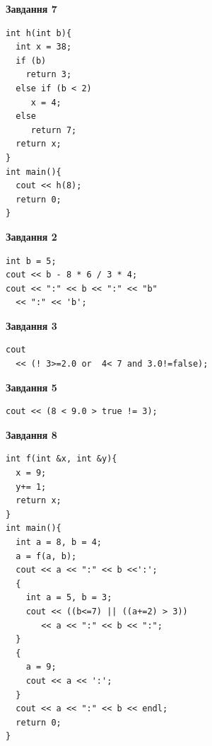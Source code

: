 \documentclass[12pt, ukrainian]{article}
\begin{document}
{\begin {large}
\begin{minipage}[t]{7.0cm}
\begin{center}
\textbf{Завдання 7}
\end{center}
\vspace{-8mm}

\begin{verbatim}
int h(int b){
  int x = 38;
  if (b)
    return 3;
  else if (b < 2)
     x = 4;
  else
     return 7;
  return x;
}
int main(){
  cout << h(8);
  return 0;
}
\end{verbatim}

\end{minipage}
\vline \hspace{1mm}
\begin{minipage}[t]{11.0cm}

\begin{center}
\textbf{Завдання 2}
\end{center}
\vspace{-8mm}

\begin{verbatim}
int b = 5;
cout << b - 8 * 6 / 3 * 4;
cout << ":" << b << ":" << "b" 
  << ":" << 'b';
\end{verbatim}



\begin{center}
\textbf{Завдання 3}
\end{center}
\vspace{-8mm}

\begin{verbatim}
cout 
  << (! 3>=2.0 or  4< 7 and 3.0!=false);
\end{verbatim}



\begin{center}
\textbf{Завдання 5}
\end{center}
\vspace{-8mm}

\begin{verbatim}
cout << (8 < 9.0 > true != 3);
\end{verbatim}



\begin{center}
\textbf{Завдання 8}
\end{center}
\vspace{-8mm}

\begin{verbatim}
int f(int &x, int &y){
  x = 9;
  y+= 1;
  return x;
}
int main(){
  int a = 8, b = 4;
  a = f(a, b);
  cout << a << ":" << b <<':';
  {
    int a = 5, b = 3;
    cout << ((b<=7) || ((a+=2) > 3))
       << a << ":" << b << ":";
  }
  {
    a = 9;
    cout << a << ':';
  }
  cout << a << ":" << b << endl;
  return 0;
}
\end{verbatim}


\end{minipage}
\end{large}}
\end{document}

